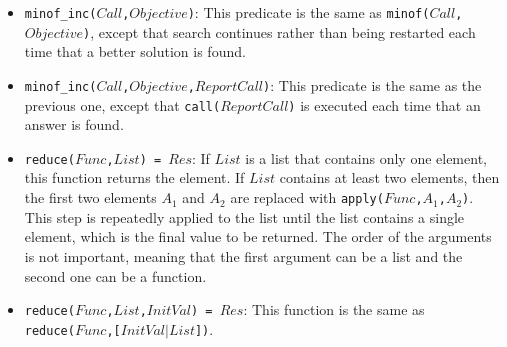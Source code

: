 \begin{itemize}
\item \texttt{minof\_inc($Call$,$Objective$)}: This predicate is the same as \texttt{minof($Call$,$Objective$)}, except that search continues rather than being restarted each time that a better solution is found.
\item \texttt{minof\_inc($Call$,$Objective$,$ReportCall$)}: This predicate is the same as the previous one, except that \texttt{call($ReportCall$)} is executed each time that an answer is found.
\item \texttt{reduce($Func$,$List$) = $Res$}: If $List$ is a list that contains only one element, this function returns the element. If $List$ contains at least two elements, then the first two elements $A_1$ and $A_2$ are replaced with \texttt{apply($Func$,$A_1$,$A_2$)}. This step is repeatedly applied to the list until the list contains a single element, which is the final value to be returned. The order of the arguments is not important, meaning that the first argument can be a list and the second one can be a function.
\item \texttt{reduce($Func$,$List$,$InitVal$) = $Res$}: This function is the same as\\
 \texttt{reduce($Func$,[$InitVal$$|$$List$])}.
\end{itemize}


